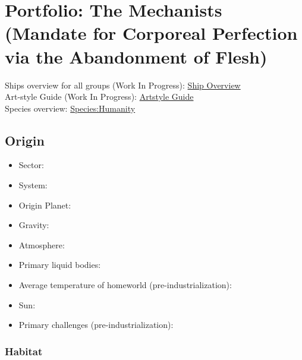 \section{Portfolio: The Mechanists (Mandate for Corporeal Perfection via the Abandonment of Flesh)}
Ships overview for all groups (Work In Progress): \href{http://vegastrike.sourceforge.net/wiki/Artstyle\_guide:Overview\_Guide}{Ship Overview} \\
Art-style Guide (Work In Progress): \href{http://vegastrike.sourceforge.net/wiki/Artstyle\_guide:Mechanist}{Artstyle Guide} \\
Species overview: \href{http://vegastrike.sourceforge.net/wiki/Species:Humanity}{Species:Humanity} \\

\subsection{Origin}
\begin{itemize}
\item Sector: 
\item System: 
\item Origin Planet:  
\item Gravity: 

\item Atmosphere: 

\item Primary liquid bodies: 

\item Average temperature of homeworld (pre-industrialization):

\item Sun: 

\item Primary challenges (pre-industrialization): 
\end{itemize}


\subsubsection{Habitat}

